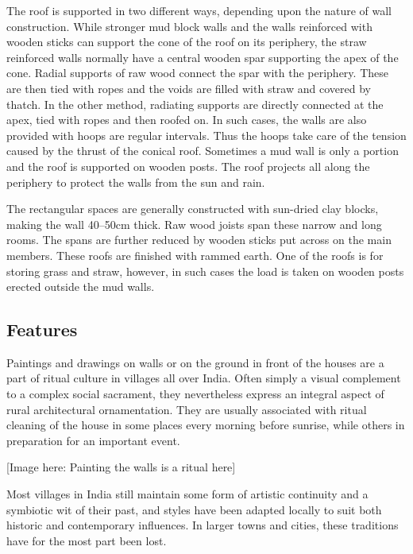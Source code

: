 The roof is supported in two different ways, depending upon the nature of wall construction. While stronger mud block walls and the walls reinforced with wooden sticks can support the cone of the roof on its periphery, the straw reinforced walls normally have a central wooden spar supporting the apex of the cone. Radial supports of raw wood connect the spar with the periphery. These are then tied with ropes and the voids are filled with straw and covered by thatch. In the other method, radiating supports are directly connected at the apex, tied with ropes and then roofed on. In such cases, the walls are also provided with hoops are regular intervals. Thus the hoops take care of the tension caused by the thrust of the conical roof. Sometimes a mud wall is only a portion and the roof is supported on wooden posts. The roof projects all along the periphery to protect the walls from the sun and rain.

The rectangular spaces are generally constructed with sun-dried clay blocks, making the wall 40--50cm thick. Raw wood joists span these narrow and long rooms. The spans are further reduced by wooden sticks put across on the main members. These roofs are finished with rammed earth. One of the roofs is for storing grass and straw, however, in such cases the load is taken on wooden posts erected outside the mud walls.


\subsection{Features} %
\label{sub:bvk_feat}

Paintings and drawings on walls or on the ground in front of the houses are a part of ritual culture in villages all over India. Often simply a visual complement to a complex social sacrament, they nevertheless express an integral aspect of rural architectural ornamentation. They are usually associated with ritual cleaning of the house in some places every morning before sunrise, while others in preparation for an important event.

[Image here: Painting the walls is a ritual here]

Most villages in India still maintain some form of artistic continuity and a symbiotic wit of their past, and styles have been adapted locally to suit both historic and contemporary influences. In larger towns and cities, these traditions have for the most part been lost.

